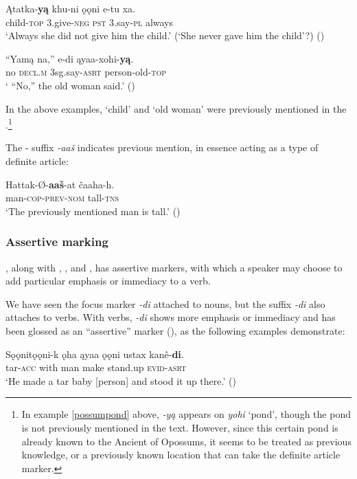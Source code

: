 \documentclass[output=paper]{LSP/langsci}
\begin{document}
\ea
\gll	Ątatka-\textbf{yą } khu-ni 	 ǫǫni e-tu 	 xa.\\ 
child-\textsc{top} 3.give-\textsc{neg} \textsc{pst} 	 3.say-\textsc{pl} always \\
\glt `Always she did not give him the child.' (`She never gave him the child'?) (\citealt[43]{DorseySwanton1912})
\z

\ea
\gll	“Yamą na,” 	 e-di 	 ąyaa-xohi-\textbf{yą}.\\
	\hspace{.6em}no 	\textsc{decl.m} 3sg.say-\textsc{asrt} person-old-\textsc{top} \\
\glt ` ``No,'' the old woman said.' (\citealt[67]{DorseySwanton1912})
\z

In the above examples, `child' and `old woman' were previously mentioned in the .\footnote{In example \ref{possumpond} above, \emph{-yą} appears on \emph{yohi} `pond', though the pond is not previously mentioned in the text. However, since this certain pond is already known to the Ancient of Opossums, it seems to be treated as previous knowledge, or a previously known location that can take the definite article marker.}

	The - suffix \emph{-aaš} indicates previous mention, in essence acting as a type of definite article:

\ea
\gll	Hattak-Ø-\textbf{aaš}-at čaaha-h.\\
	man-\textsc{cop-prev-nom} tall-\textsc{tns} \\
\glt `The previously mentioned man is tall.' 
(\citealt[89]{Broadwell2006})
\z

\subsubsection{Assertive marking}

, along with , , and , has assertive markers, with which a speaker may choose to add particular emphasis or immediacy to a verb. 

	We have seen the  focus marker \emph{-di} attached to nouns, but the suffix \emph{-di} also attaches to verbs. With verbs, \emph{-di} shows more emphasis or immediacy and has been glossed as an “assertive” marker (\citealt[3]{Kaufman2011}), as the following examples demonstrate:

\ea
\gll	Sǫǫnitǫǫni-k ǫha ąyaa ǫǫni ustax kanê-\textbf{di}. \\
	tar-\textsc{acc}  with man make stand.up \textsc{evid-asrt}\\
\glt `He made a tar baby [person] and stood it up there.' (\citealt[13]{DorseySwanton1912})
\z
\end{document}
